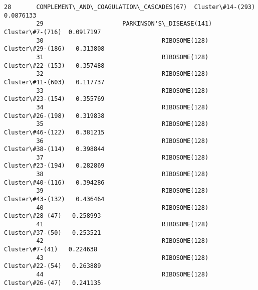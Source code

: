 \documentclass[11pt]{article}
\begin{document}
\begin{Verbatim}[commandchars=\\\{\}]
         28       COMPLEMENT\_AND\_COAGULATION\_CASCADES(67)  Cluster\#14-(293)  0.0876133  
         29                      PARKINSON'S\_DISEASE(141)   Cluster\#7-(716)  0.0917197  
         30                                 RIBOSOME(128)  Cluster\#29-(186)   0.313808  
         31                                 RIBOSOME(128)  Cluster\#22-(153)   0.357488  
         32                                 RIBOSOME(128)  Cluster\#11-(603)   0.117737  
         33                                 RIBOSOME(128)  Cluster\#23-(154)   0.355769  
         34                                 RIBOSOME(128)  Cluster\#26-(198)   0.319838  
         35                                 RIBOSOME(128)  Cluster\#46-(122)   0.381215  
         36                                 RIBOSOME(128)  Cluster\#38-(114)   0.398844  
         37                                 RIBOSOME(128)  Cluster\#23-(194)   0.282869  
         38                                 RIBOSOME(128)  Cluster\#40-(116)   0.394286  
         39                                 RIBOSOME(128)  Cluster\#43-(132)   0.436464  
         40                                 RIBOSOME(128)   Cluster\#28-(47)   0.258993  
         41                                 RIBOSOME(128)   Cluster\#37-(50)   0.253521  
         42                                 RIBOSOME(128)    Cluster\#7-(41)   0.224638  
         43                                 RIBOSOME(128)   Cluster\#22-(54)   0.263889  
         44                                 RIBOSOME(128)   Cluster\#26-(47)   0.241135  
\end{Verbatim}
            

    
    
    
    
\end{document}
